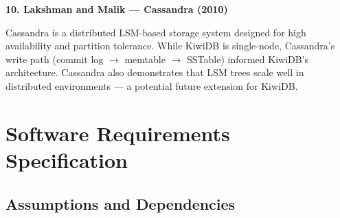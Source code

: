 \documentclass[oneside,a4paper,12pt]{book}
\begin{document}
\textbf{10. Lakshman and Malik --- Cassandra (2010) \cite{c3}}

Cassandra is a distributed LSM-based storage system designed for high availability and partition tolerance. While KiwiDB is single-node, Cassandra's write path (commit log $\rightarrow$ memtable $\rightarrow$ SSTable) informed KiwiDB's architecture. Cassandra also demonstrates that LSM trees scale well in distributed environments --- a potential future extension for KiwiDB.





\chapter{Software Requirements Specification}

\section{Assumptions and Dependencies}
\end{document}
